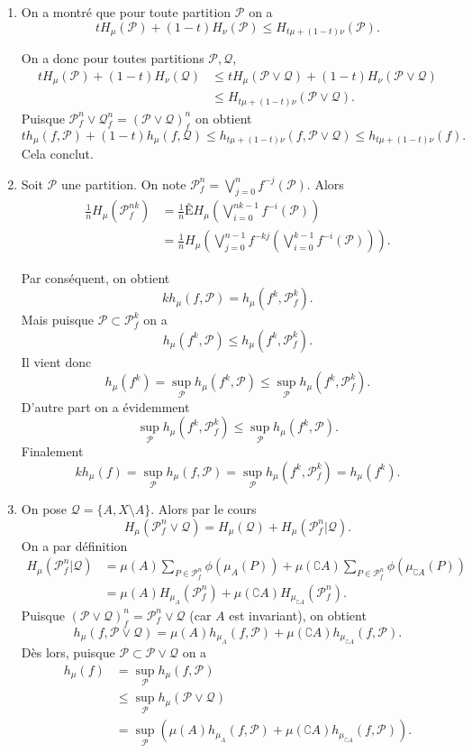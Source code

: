 \documentclass[a4paper,12pt,openany]{article}
\theoremstyle{plain}
\theoremstyle{definition}
\newcommand{\Pcal}{\mathcal{P}}
\newcommand{\Qcal}{\mathcal{Q}}
\begin{document}
\begin{enumerate}
\item On a montr\'e que pour toute partition $\Pcal$ on a 
$$
tH_\mu(\Pcal) + (1-t) H_\nu(\Pcal) \leqslant H_{t\mu + (1-t)\nu}(\Pcal).
$$

On a donc pour toutes partitions $\Pcal, \Qcal$,
$$
\begin{aligned}
tH_\mu(\Pcal) + (1-t) H_\nu(\Qcal) &\leqslant tH_\mu(\Pcal \vee \Qcal) + (1-t) H_\nu(\Pcal \vee \Qcal)  \\
&\leqslant  H_{t\mu + (1-t)\nu}(\Pcal \vee \Qcal).
\end{aligned}
$$
 Puisque $\Pcal^n_f \vee \Qcal^n_f = (\Pcal \vee \Qcal)^n_f$ on obtient
$$
th_\mu(f, \Pcal) + (1-t)h_\mu(f,\Qcal) \leqslant h_{t\mu + (1-t)\nu}(f, \Pcal \vee \Qcal) \leqslant h_{t\mu + (1-t)\nu}(f).
$$ 
 Cela conclut.  
\item Soit $\Pcal$ une partition. On note $\Pcal^n_f = \bigvee_{j=0}^n f^{-j}(\Pcal)$.  Alors
$$
\begin{aligned}
\frac{1}{n} H_\mu(\Pcal^{nk}_f) &= \frac{1}{n}ÊH_\mu\left(\bigvee_{i=0}^{nk-1}f^{-i}(\Pcal)\right)  \\
&= \frac{1}{n} H_\mu\left(\bigvee_{j=0}^{n-1}f^{-kj}\left(\bigvee_{i=0}^{k-1}f^{-i}(\Pcal)\right)\right).
\end{aligned}
$$


Par cons\'equent, on obtient 
$$
k h_\mu(f, \Pcal) = h_\mu(f^k, \Pcal^k_f).
$$
 Mais puisque $\Pcal \subset \Pcal^k_f$ on a
$$
h_\mu(f^k, \Pcal) \leqslant h_\mu(f^k, \Pcal^k_f).
$$
 Il vient donc
$$
h_\mu(f^k) = \sup_\Pcal h_\mu(f^k, \Pcal) \leqslant \sup_\Pcal h_\mu(f^k, \Pcal^k_f).
$$
 D'autre part on a \'evidemment
$$
\sup_\Pcal h_\mu(f^k, \Pcal^k_f) \leqslant \sup_\Pcal h_\mu(f^k, \Pcal).
$$
 Finalement 
$$kh_\mu(f) = \sup_\Pcal h_\mu(f,\Pcal) = \sup_{\Pcal} h_\mu(f^k, \Pcal^k_f) = h_\mu(f^k).$$




\item On pose $\Qcal = \{A, X \setminus A\}.$ Alors par le cours
$$
H_\mu(\Pcal^n_f \vee \Qcal) = H_\mu(\Qcal) + H_\mu(\Pcal^n_f |\Qcal).
$$
 On a par d\'efinition
$$
\begin{aligned}
H_\mu(\Pcal^n_f |\Qcal) &= \mu(A) \sum_{P \in \Pcal^n_f} \phi(\mu_A(P)) + \mu(\complement A) \sum_{P \in \Pcal^n_f} \phi(\mu_{\complement A}(P))  \\
&= \mu(A) H_{\mu_A}(\Pcal^n_f) + \mu(\complement A) H_{\mu_{\complement A}}(\Pcal^n_f).
\end{aligned}
$$
 Puisque $(\Pcal \vee \Qcal)^n_f = \Pcal^n_f \vee \Qcal$ (car $A$ est invariant), on obtient
$$
h_\mu(f, \Pcal \vee \Qcal) = \mu(A) h_{\mu_A}(f,\Pcal) + \mu(\complement A) h_{\mu_{\complement A}}(f, \Pcal).
$$
 D\`es lors, puisque $\Pcal \subset \Pcal \vee \Qcal$ on a 
$$
\begin{aligned}
h_\mu(f) &= \sup_\Pcal h_\mu(f, \Pcal)  \\
&\leqslant \sup_\Pcal h_\mu(\Pcal \vee \Qcal)  \\
&= \sup_\Pcal\left( \mu(A) h_{\mu_A}(f,\Pcal) + \mu(\complement A) h_{\mu_{\complement A}}(f, \Pcal)\right).
\end{aligned}
$$




\end{enumerate}
\end{document}
